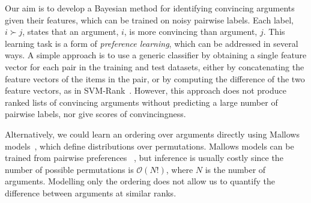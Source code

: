 Our aim is to develop a Bayesian method for identifying convincing arguments 
given their features, which can be trained on noisy pairwise labels.
Each label, $i \succ j$, states that an argument, $i$, is more convincing than argument, $j$. 
This learning task is a form of \emph{preference learning}, which can be addressed in several ways.
A simple approach is to use a generic classifier by
obtaining a single feature vector for each pair in the training and test datasets,
either by concatenating the feature vectors of the items in the pair, 
or by computing the difference of the two feature vectors, as in SVM-Rank~\cite{joachims2002optimizing}. 
However, this approach does not produce ranked lists of convincing arguments without predicting a large number of pairwise labels, nor give scores of convincingness. %

Alternatively, we could learn an ordering over arguments directly using Mallows models~\cite{mallows1957non},
which define distributions over permutations.  
Mallows models can be trained from pairwise preferences 
~\cite{lu2011learning}, but inference is usually costly
since the number of possible permutations is $\mathcal{O}(N!)$, 
where $N$ is the number of arguments. 
Modelling only the ordering does not allow us to quantify 
the difference between arguments at similar ranks.

